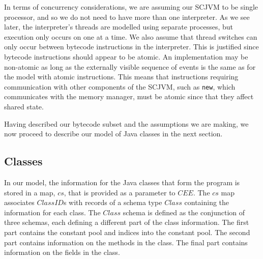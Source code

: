 In terms of concurrency considerations, we are assuming our SCJVM to
be single processor, and so we do not need to have more than one
interpreter.
As we see later, the interpreter's threads are modelled using separate
\Circus{} processes, but execution only occurs on one at a time.
We also assume that thread switches can only occur between bytecode
instructions in the interpreter.
This is justified since bytecode instructions should appear to be
atomic.
An implementation may be non-atomic as long as the externally visible
sequence of events is the same as for the model with atomic
instructions.
This means that instructions requiring communication with other
components of the SCJVM, such as \texttt{new}, which communicates with
the memory manager, must be atomic since that they affect shared
state.

Having described our bytecode subset and the assumptions we are
making, we now proceed to describe our model of Java classes in the
next section.

\subsection{Classes}
\label{cee-classes-subsection}

In our model, the information for the Java classes that form the
program is stored in a map, $cs$, that is provided as a parameter to
$CEE$.
The $cs$ map associates $ClassID$s with records of a schema type
$Class$ containing the information for each class.
The $Class$ schema is defined as the conjunction of three schemas,
each defining a different part of the class information.
The first part contains the constant pool and indices into the
constant pool.
The second part contains information on the methods in the class.
The final part contains information on the fields in the class.

